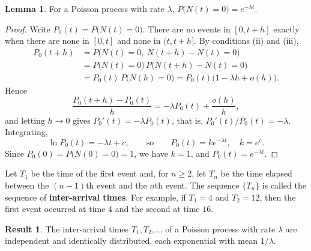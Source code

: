 \documentclass[11pt,a4paper]{article}
\theoremstyle{definition}
\newtheorem{lem}[thm]{Lemma}
\newtheorem{result}[thm]{Result}
\begin{document}
\begin{lem}\label{lem:poisson-zero}
For a Poisson process with rate $\lambda$, $P\bigl(N(t) = 0\bigr) = e^{-\lambda t}$.
\end{lem}

\begin{proof}
Write $P_0(t) = P\bigl(N(t) = 0\bigr)$. There are no events in $[0, t + h]$ exactly when there are none in $[0, t]$ and none in $(t, t + h]$. By conditions (ii) and
(iii),
\begin{align*}
P_0(t + h) &= P\bigl(N(t) = 0,\ N(t + h) - N(t) = 0\bigr) \\
&= P\bigl(N(t) = 0\bigr)\,P\bigl(N(t + h) - N(t) = 0\bigr) \\
&= P_0(t)\,P\bigl(N(h) = 0\bigr) = P_0(t)\bigl(1 - \lambda h + o(h)\bigr) .
\end{align*}
Hence
\[
\frac{P_0(t + h) - P_0(t)}{h} = -\lambda P_0(t) + \frac{o(h)}{h} ,
\]
and letting $h \to 0$ gives $P_0'(t) = -\lambda P_0(t)$, that is, $P_0'(t)/P_0(t) = -\lambda$. Integrating,
\[
\ln P_0(t) = -\lambda t + c , \qquad\text{so}\qquad P_0(t) = ke^{-\lambda t} , \quad k = e^c .
\]
Since $P_0(0) = P\bigl(N(0) = 0\bigr) = 1$, we have $k = 1$, and $P_0(t) = e^{-\lambda t}$.
\end{proof}

Let $T_1$ be the time of the first event and, for $n \ge 2$, let $T_n$ be the time elapsed between the $(n - 1)$th event and the $n$th event. The sequence
$\{T_n\}$ is called the sequence of \textbf{inter-arrival times}. For example, if $T_1 = 4$ and $T_2 = 12$, then the first event occurred at time $4$ and the second at
time $16$.

\begin{figure}[H]
\centering
{}
\end{figure}

\begin{result}\label{res:interarrival}
The inter-arrival times $T_1, T_2, \dots$ of a Poisson process with rate $\lambda$ are independent and identically distributed, each exponential with
mean $1/\lambda$.
\end{result}
\end{document}
